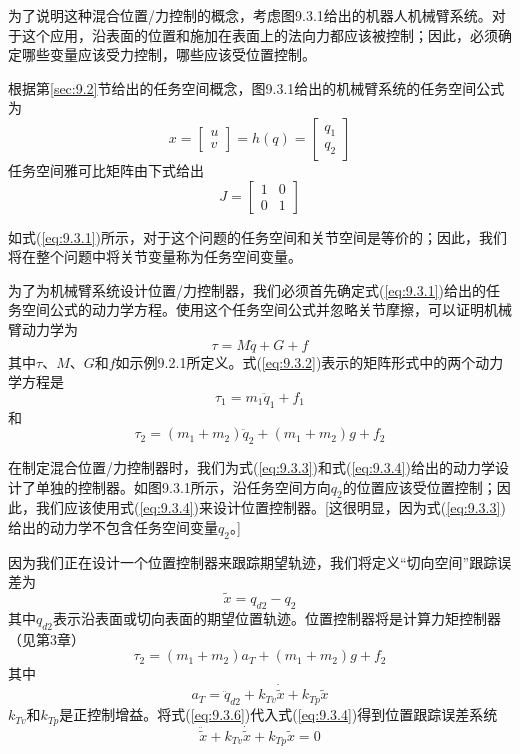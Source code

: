 \documentclass[12pt,a4paper]{ctexart}
\begin{document}
为了说明这种混合位置/力控制的概念，考虑图9.3.1给出的机器人机械臂系统。对于这个应用，沿表面的位置和施加在表面上的法向力都应该被控制；因此，必须确定哪些变量应该受力控制，哪些应该受位置控制。

根据第\ref{sec:9.2}节给出的任务空间概念，图9.3.1给出的机械臂系统的任务空间公式为
\begin{equation}\label{eq:9.3.1}
x = \begin{bmatrix} u \\ v \end{bmatrix} = h(q) = \begin{bmatrix} q_1 \\ q_2 \end{bmatrix}
\end{equation}
任务空间雅可比矩阵由下式给出
\[
J = \begin{bmatrix} 1 & 0 \\ 0 & 1 \end{bmatrix}
\]

如式(\ref{eq:9.3.1})所示，对于这个问题的任务空间和关节空间是等价的；因此，我们将在整个问题中将关节变量称为任务空间变量。

为了为机械臂系统设计位置/力控制器，我们必须首先确定式(\ref{eq:9.3.1})给出的任务空间公式的动力学方程。使用这个任务空间公式并忽略关节摩擦，可以证明机械臂动力学为
\begin{equation}\label{eq:9.3.2}
\tau = M\ddot{q} + G + f
\end{equation}
其中$\tau$、$M$、$G$和$f$如示例9.2.1所定义。式(\ref{eq:9.3.2})表示的矩阵形式中的两个动力学方程是
\begin{equation}\label{eq:9.3.3}
\tau_1 = m_1\ddot{q}_1 + f_1
\end{equation}
和
\begin{equation}\label{eq:9.3.4}
\tau_2 = (m_1 + m_2)\ddot{q}_2 + (m_1 + m_2)g + f_2
\end{equation}

在制定混合位置/力控制器时，我们为式(\ref{eq:9.3.3})和式(\ref{eq:9.3.4})给出的动力学设计了单独的控制器。如图9.3.1所示，沿任务空间方向$q_2$的位置应该受位置控制；因此，我们应该使用式(\ref{eq:9.3.4})来设计位置控制器。[这很明显，因为式(\ref{eq:9.3.3})给出的动力学不包含任务空间变量$q_2$。]

因为我们正在设计一个位置控制器来跟踪期望轨迹，我们将定义``切向空间''跟踪误差为
\begin{equation}\label{eq:9.3.5}
\tilde{x} = q_{d2} - q_2
\end{equation}
其中$q_{d2}$表示沿表面或切向表面的期望位置轨迹。位置控制器将是计算力矩控制器（见第3章）
\begin{equation}\label{eq:9.3.6}
\tau_2 = (m_1 + m_2)a_T + (m_1 + m_2)g + f_2
\end{equation}
其中
\begin{equation}\label{eq:9.3.7}
a_T = \ddot{q}_{d2} + k_{Tv}\dot{\tilde{x}} + k_{Tp}\tilde{x}
\end{equation}
$k_{Tv}$和$k_{Tp}$是正控制增益。将式(\ref{eq:9.3.6})代入式(\ref{eq:9.3.4})得到位置跟踪误差系统
\begin{equation}\label{eq:9.3.8}
\ddot{\tilde{x}} + k_{Tv}\dot{\tilde{x}} + k_{Tp}\tilde{x} = 0
\end{equation}
\end{document}
